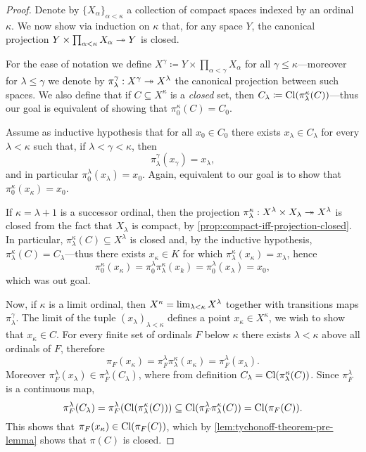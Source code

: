 \begin{proof}
Denote by \(\{X_{\alpha}\}_{\alpha < \kappa}\) a collection of compact spaces
indexed by an ordinal \(\kappa\). We now show via induction on \(\kappa\) that,
for any space \(Y\), the canonical projection
\(Y \times \prod_{\alpha < \kappa} X_{\alpha} \twoheadrightarrow Y\) is closed.

For the ease of notation we define
\(X^{\gamma} \coloneq Y \times \prod_{\alpha < \gamma} X_{\alpha}\) for all
\(\gamma \leq \kappa\)---moreover for \(\lambda \leq \gamma\) we denote by
\(\pi_{\lambda}^{\gamma}: X^{\gamma} \twoheadrightarrow X^{\lambda}\) the canonical projection
between such spaces. We also define that if \(C \subseteq X^{\kappa}\) is a
\emph{closed} set, then
\(C_{\lambda} \coloneq \operatorname{Cl}(\pi_{\lambda}^{\kappa}(C))\)---thus our goal is
equivalent of showing that \(\pi_0^{\kappa}(C) = C_0\).

Assume as inductive hypothesis that for all \(x_0 \in C_0\) there exists
\(x_{\lambda} \in C_{\lambda}\) for every \(\lambda < \kappa\) such that, if
\(\lambda < \gamma < \kappa\), then
\[
\pi_{\lambda}^{\gamma}(x_{\gamma}) = x_{\lambda},
\]
and in particular \(\pi_0^{\lambda}(x_{\lambda}) = x_0\). Again, equivalent to
our goal is to show that \(\pi_0^{\kappa}(x_{\kappa}) = x_0\).

If \(\kappa = \lambda + 1\) is a successor ordinal, then the projection
\(\pi_{\lambda}^{\kappa}: X^{\lambda} \times X_{\lambda} \twoheadrightarrow X^{\lambda}\) is
closed from the fact that \(X_{\lambda}\) is compact, by
\cref{prop:compact-iff-projection-closed}. In particular,
\(\pi_{\lambda}^{\kappa}(C) \subseteq X^{\lambda}\) is closed and, by the
inductive hypothesis, \(\pi_{\lambda}^{\kappa}(C) = C_{\lambda}\)---thus there
exists \(x_{\kappa} \in K\) for which
\(\pi_{\lambda}^{\kappa}(x_{\kappa}) = x_{\lambda}\), hence
\[
\pi_0^{\kappa}(x_{\kappa})
= \pi_0^{\lambda} \pi_{\lambda}^{\kappa}(x_k)
= \pi_0^{\lambda}(x_{\lambda})
= x_0,
\]
which was out goal.

Now, if \(\kappa\) is a limit ordinal, then
\(X^{\kappa} = \operatorname{lim}_{\lambda < \kappa} X^{\lambda}\) together with
transitions maps \(\pi_{\lambda}^{\gamma}\). The limit of the tuple
\((x_{\lambda})_{\lambda < \kappa}\) defines a point
\(x_{\kappa} \in X^\kappa\), we wish to show that \(x_{\kappa} \in C\). For
every finite set of ordinals \(F\) below \(\kappa\) there exists
\(\lambda < \kappa\) above all ordinals of \(F\), therefore
\[
\pi_F(x_{\kappa})
= \pi_F^{\lambda}\pi_{\lambda}^{\kappa}(x_{\kappa})
= \pi_F^{\lambda}(x_{\lambda}).
\]
Moreover \(\pi_F^{\lambda}(x_{\lambda}) \in \pi_F^{\lambda}(C_{\lambda})\),
where from definition \(C_{\lambda} =
\operatorname{Cl}(\pi_{\lambda}^{\kappa}(C))\). Since \(\pi_F^{\lambda}\) is a
continuous map,
\[
\pi_F^{\lambda}(C_{\lambda})
= \pi_F^{\lambda}(\operatorname{Cl}(\pi_{\lambda}^{\kappa}(C)))
\subseteq \operatorname{Cl}(\pi_F^{\lambda} \pi_{\lambda}^{\kappa}(C))
= \operatorname{Cl}(\pi_F(C)).
\]
This shows that \(\pi_F(x_{\kappa}) \in \operatorname{Cl}(\pi_F(C))\), which by
\cref{lem:tychonoff-theorem-pre-lemma} shows that \(\pi(C)\) is closed.
\end{proof}

